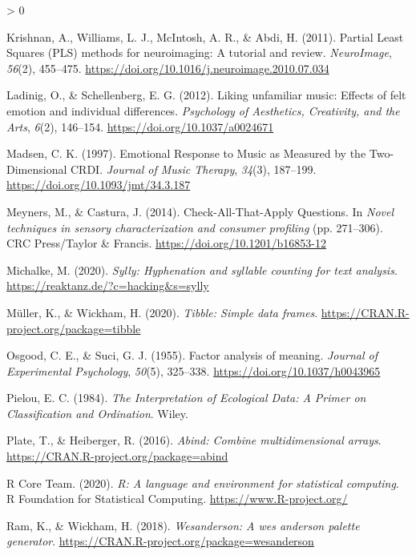\documentclass[
  english,
  man]{apa6}
\newlength{\cslhangindent}
\newenvironment{CSLReferences}[2] %
 {%
  \setlength{\parindent}{0pt}
  \ifodd #1 \everypar{\setlength{\hangindent}{\cslhangindent}}\ignorespaces\fi
  \ifnum #2 > 0
  \setlength{\parskip}{#2\baselineskip}
  \fi
 }%
 {}
\begin{document}
\begin{CSLReferences}{1}{0}
\leavevmode\hypertarget{ref-Krishnan2011}{}%
Krishnan, A., Williams, L. J., McIntosh, A. R., \& Abdi, H. (2011). {Partial Least Squares (PLS) methods for neuroimaging: A tutorial and review}. \emph{NeuroImage}, \emph{56}(2), 455--475. \url{https://doi.org/10.1016/j.neuroimage.2010.07.034}

\leavevmode\hypertarget{ref-Ladinig2012}{}%
Ladinig, O., \& Schellenberg, E. G. (2012). {Liking unfamiliar music: Effects of felt emotion and individual differences}. \emph{Psychology of Aesthetics, Creativity, and the Arts}, \emph{6}(2), 146--154. \url{https://doi.org/10.1037/a0024671}

\leavevmode\hypertarget{ref-Madsen1997}{}%
Madsen, C. K. (1997). {Emotional Response to Music as Measured by the Two-Dimensional CRDI}. \emph{Journal of Music Therapy}, \emph{34}(3), 187--199. \url{https://doi.org/10.1093/jmt/34.3.187}

\leavevmode\hypertarget{ref-Meyners2014}{}%
Meyners, M., \& Castura, J. (2014). {Check-All-That-Apply Questions}. In \emph{Novel techniques in sensory characterization and consumer profiling} (pp. 271--306). CRC Press/Taylor {\&} Francis. \url{https://doi.org/10.1201/b16853-12}

\leavevmode\hypertarget{ref-R-sylly}{}%
Michalke, M. (2020). \emph{Sylly: Hyphenation and syllable counting for text analysis}. \url{https://reaktanz.de/?c=hacking\&s=sylly}

\leavevmode\hypertarget{ref-R-tibble}{}%
Müller, K., \& Wickham, H. (2020). \emph{Tibble: Simple data frames}. \url{https://CRAN.R-project.org/package=tibble}

\leavevmode\hypertarget{ref-Osgood1955}{}%
Osgood, C. E., \& Suci, G. J. (1955). {Factor analysis of meaning}. \emph{Journal of Experimental Psychology}, \emph{50}(5), 325--338. \url{https://doi.org/10.1037/h0043965}

\leavevmode\hypertarget{ref-Pielou1984}{}%
Pielou, E. C. (1984). \emph{{The Interpretation of Ecological Data: A Primer on Classification and Ordination}}. Wiley.

\leavevmode\hypertarget{ref-R-abind}{}%
Plate, T., \& Heiberger, R. (2016). \emph{Abind: Combine multidimensional arrays}. \url{https://CRAN.R-project.org/package=abind}

\leavevmode\hypertarget{ref-R-base}{}%
R Core Team. (2020). \emph{R: A language and environment for statistical computing}. R Foundation for Statistical Computing. \url{https://www.R-project.org/}

\leavevmode\hypertarget{ref-R-wesanderson}{}%
Ram, K., \& Wickham, H. (2018). \emph{Wesanderson: A wes anderson palette generator}. \url{https://CRAN.R-project.org/package=wesanderson}


\end{CSLReferences}
\end{document}
